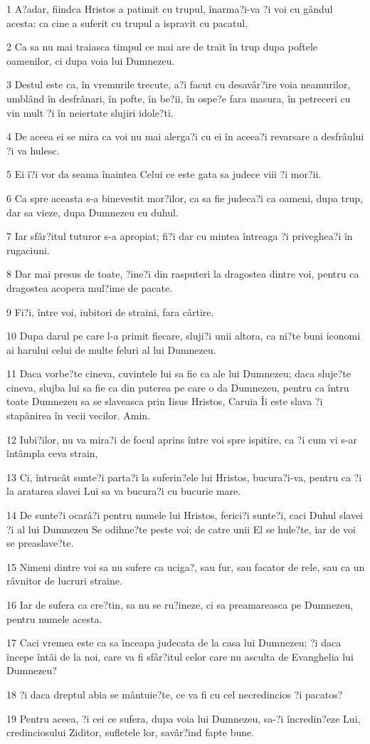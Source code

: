 \par 1 A?adar, fiindca Hristos a patimit cu trupul, înarma?i-va ?i voi cu gândul acesta: ca cine a suferit cu trupul a ispravit cu pacatul,
\par 2 Ca sa nu mai traiasca timpul ce mai are de trait în trup dupa poftele oamenilor, ci dupa voia lui Dumnezeu.
\par 3 Destul este ca, în vremurile trecute, a?i facut cu desavâr?ire voia neamurilor, umblând în desfrânari, în pofte, în be?ii, în ospe?e fara masura, în petreceri cu vin mult ?i în neiertate slujiri idole?ti.
\par 4 De aceea ei se mira ca voi nu mai alerga?i cu ei în aceea?i revarsare a desfrâului ?i va hulesc.
\par 5 Ei î?i vor da seama înaintea Celui ce este gata sa judece viii ?i mor?ii.
\par 6 Ca spre aceasta s-a binevestit mor?ilor, ca sa fie judeca?i ca oameni, dupa trup, dar sa vieze, dupa Dumnezeu cu duhul.
\par 7 Iar sfâr?itul tuturor s-a apropiat; fi?i dar cu mintea întreaga ?i priveghea?i în rugaciuni.
\par 8 Dar mai presus de toate, ?ine?i din rasputeri la dragostea dintre voi, pentru ca dragostea acopera mul?ime de pacate.
\par 9 Fi?i, între voi, iubitori de straini, fara cârtire.
\par 10 Dupa darul pe care l-a primit fiecare, sluji?i unii altora, ca ni?te buni iconomi ai harului celui de multe feluri al lui Dumnezeu.
\par 11 Daca vorbe?te cineva, cuvintele lui sa fie ca ale lui Dumnezeu; daca sluje?te cineva, slujba lui sa fie ca din puterea pe care o da Dumnezeu, pentru ca întru toate Dumnezeu sa se slaveasca prin Iisus Hristos, Caruia Îi este slava ?i stapânirea în vecii vecilor. Amin.
\par 12 Iubi?ilor, nu va mira?i de focul aprins între voi spre ispitire, ca ?i cum vi s-ar întâmpla ceva strain,
\par 13 Ci, întrucât sunte?i parta?i la suferin?ele lui Hristos, bucura?i-va, pentru ca ?i la aratarea slavei Lui sa va bucura?i cu bucurie mare.
\par 14 De sunte?i ocarâ?i pentru numele lui Hristos, ferici?i sunte?i, caci Duhul slavei ?i al lui Dumnezeu Se odihne?te peste voi; de catre unii El se hule?te, iar de voi se preaslave?te.
\par 15 Nimeni dintre voi sa nu sufere ca uciga?, sau fur, sau facator de rele, sau ca un râvnitor de lucruri straine.
\par 16 Iar de sufera ca cre?tin, sa nu se ru?ineze, ci sa preamareasca pe Dumnezeu, pentru numele acesta.
\par 17 Caci vremea este ca sa înceapa judecata de la casa lui Dumnezeu; ?i daca începe întâi de la noi, care va fi sfâr?itul celor care nu asculta de Evanghelia lui Dumnezeu?
\par 18 ?i daca dreptul abia se mântuie?te, ce va fi cu cel necredincios ?i pacatos?
\par 19 Pentru aceea, ?i cei ce sufera, dupa voia lui Dumnezeu, sa-?i încredin?eze Lui, credinciosului Ziditor, sufletele lor, savâr?ind fapte bune.

